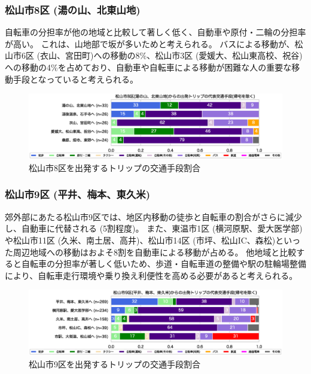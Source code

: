 \documentclass[a4paper,12pt, uplatex]{jsbook}
\begin{document}
\subsubsection{松山市8区 (湯の山、北東山地)}
自転車の分担率が他の地域と比較して著しく低く、自動車や原付・二輪の分担率が高い。
これは、山地部で坂が多いためと考えられる。
バスによる移動が、松山市6区 (衣山、宮田町)への移動の8\%、松山市3区 (愛媛大、松山東高校、祝谷)への移動の4\%を占めており、自動車や自転車による移動が困難な人の重要な移動手段となっていると考えられる。
%
\begin{figure}[H]
    \centering
    \includegraphics[width=1.0\textwidth]{picture/mode_share_松山市8区.eps}
    \caption{松山市8区を出発するトリップの交通手段割合}
    \label{fig:mode_share_8}
\end{figure}

\subsubsection{松山市9区 (平井、梅本、東久米)}
郊外部にあたる松山市9区では、地区内移動の徒歩と自転車の割合がさらに減少し、自動車に代替される (5割程度)。
また、東温市1区 (横河原駅、愛大医学部)や松山市11区 (久米、南土居、高井)、松山市14区 (市坪、松山IC、森松)といった周辺地域への移動はおよそ8割を自動車による移動が占める。
他地域と比較すると自転車の分担率が著しく低いため、歩道・自転車道の整備や駅の駐輪場整備により、自転車走行環境や乗り換え利便性を高める必要があると考えられる。
%
\begin{figure}[H]
    \centering
    \includegraphics[width=1.0\textwidth]{picture/mode_share_松山市9区.eps}
    \caption{松山市9区を出発するトリップの交通手段割合}
    \label{fig:mode_share_9}
\end{figure}
\end{document}
